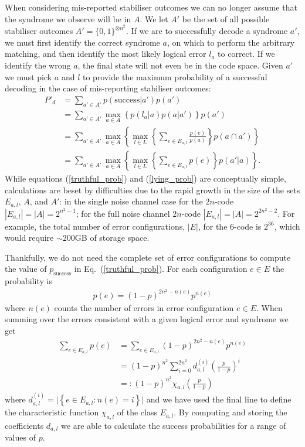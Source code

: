 When considering mis-reported stabiliser outcomes we can no longer assume that the syndrome we observe will be in $A$. We let $A'$ be the set of all possible stabiliser outcomes $A' = \{0, 1\}^{\otimes n^2}$. If we are to successfully decode a syndrome $a'$, we must first identify the correct syndrome $a$, on which to perform the arbitrary matching, and then identify the most likely logical error $l_a$ to correct. If we identify the wrong $a$, the final state will not even be in the code space. Given $a'$ we must pick $a$ and $l$ to provide the maximum probability of a successful decoding in the case of mis-reporting stabiliser outcomes:
\begin{align}
  P'_d &= \sum_{a' \in A'} p(\text{success} \vert a') p(a') \\
  &= \sum_{a'\in A'} \max_{a \in A} \left\{ p(l_a \vert a) p(a \vert a') \right\} p(a')\\
  &= \sum_{a'\in A'} \max_{a \in A} \left\{ \max_{l \in L} \left\{\sum_{e \in E_{a,l}} \frac{p(e)}{p(a)} \right\} p(a \cap a') \right\}\\
  &= \sum_{a'\in A'} \max_{a \in A} \left\{ \max_{l \in L} \left\{\sum_{e \in E_{a,l}} p(e) \right\} p(a' \vert a) \right\}. \label{lying_prob}
\end{align}
While equations (\ref{truthful_prob}) and (\ref{lying_prob}) are conceptually simple, calculations are beset by difficulties due to the rapid growth in the size of the sets $E_{a,l}$, $A$, and $A'$: in the single noise channel case for the $2n$-code $|E_{a,l}| = |A| = 2^{n^2-1}$; for the full noise channel $2n$-code $|E_{a,l}| = |A| = 2^{2n^2 - 2}$. For example, the total number of error configurations, $|E|$, for the $6$-code is $2^{36}$, which would require $\sim200$GB of storage space.

Thankfully, we do not need the complete set of error configurations to compute the value of $p_\text{success}$ in Eq.~(\ref{truthful_prob}). For each configuration $e\in E$ the probability is
\begin{align}
  p(e) = (1-p)^{2n^2 - n(e)} p^{n(e)}
\end{align}
where $n(e)$ counts the number of errors in error configuration $e \in E$. When summing over the errors consistent with a given logical error and syndrome we get
\begin{align}
  \sum_{e \in E_{a,l}} p(e) &= \sum_{e \in E_{a,l}} (1-p)^{2n^2 - n(e)} p^{n(e)} \\
  &= (1-p)^{n^2} \sum_{i = 0}^{2n^2} d_{a,l}^{(i)} \left(\frac{p}{1-p}\right)^i \\
  &=: (1-p)^{n^2} \chi_{a,l}\left(\frac{p}{1-p}\right)
\end{align}
where $d_{a,l}^{(i)} = \vert \left\{e \in E_{a,l} : n(e)=i \right\} \vert$ and we have used the final line to define the characteristic function $\chi_{a,l}$ of the class $E_{a,l}$. By computing and storing the coefficients $d_{a,l}$ we are able to calculate the success probabilities for a range of values of $p$.

